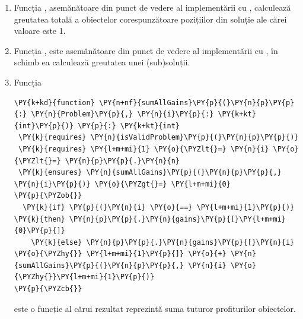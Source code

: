 \begin{sloppypar}
\begin{enumerate}
\begin{Verbatim}[commandchars=\\\{\}]
  \PY{k}{requires} \PY{l+m+mi}{0} \PY{o}{\PYZlt{}=} \PY{o}{|}\PY{n}{solution}\PY{o}{|} \PY{o}{\PYZlt{}=} \PY{o}{|}\PY{n}{p}\PY{p}{.}\PY{n}{gains}\PY{o}{|}
  \PY{k}{ensures} \PY{n}{computeGain}\PY{p}{(}\PY{n}{p}\PY{p}{,} \PY{n}{solution}\PY{p}{,} \PY{n}{i}\PY{p}{)} \PY{o}{\PYZgt{}=} \PY{l+m+mi}{0}
\PY{p}{\PYZob{}}
  \PY{k}{if} \PY{n}{i} \PY{o}{==} \PY{l+m+mi}{0} \PY{k}{then} \PY{n}{solution}\PY{p}{[}\PY{l+m+mi}{0}\PY{p}{]} \PY{o}{*} \PY{n}{p}\PY{p}{.}\PY{n}{gains}\PY{p}{[}\PY{l+m+mi}{0}\PY{p}{]} \PY{k}{else} 
  \PY{n}{solution}\PY{p}{[}\PY{n}{i}\PY{p}{]} \PY{o}{*} \PY{n}{p}\PY{p}{.}\PY{n}{gains}\PY{p}{[}\PY{n}{i}\PY{p}{]} \PY{o}{+} \PY{n}{computeGain}\PY{p}{(}\PY{n}{p}\PY{p}{,} \PY{n}{solution}\PY{p}{,} \PY{n}{i} \PY{o}{\PYZhy{}} \PY{l+m+mi}{1}\PY{p}{)}
\PY{p}{\PYZcb{}}
\end{Verbatim}
    spre deosebire de $gain$, poate primi o subsoluție al cărui profit se dorește a fi calculat prin specificarea unui index $i$ reprezentând poziția de la final spre început a subsoluției. Este o funcție recursivă a cărei finalitate este asigurată prin condiția $i == 0$.
    \item Funcția , asemănătoare din punct de vedere al implementării cu , calculează greutatea totală a obiectelor corespunzătoare pozițiilor din soluție ale cărei valoare este 1.
    \item Funcția , este asemănătoare din punct de vedere al implementării cu , în schimb ea calculează greutatea unei (sub)soluții.
    \item Funcția 
    \begin{Verbatim}[commandchars=\\\{\}]
\PY{k+kd}{function} \PY{n+nf}{sumAllGains}\PY{p}{(}\PY{n}{p}\PY{p}{:} \PY{n}{Problem}\PY{p}{,} \PY{n}{i}\PY{p}{:} \PY{k+kt}{int}\PY{p}{)} \PY{p}{:} \PY{k+kt}{int}
 \PY{k}{requires} \PY{n}{isValidProblem}\PY{p}{(}\PY{n}{p}\PY{p}{)}
 \PY{k}{requires} \PY{l+m+mi}{1} \PY{o}{\PYZlt{}=} \PY{n}{i} \PY{o}{\PYZlt{}=} \PY{n}{p}\PY{p}{.}\PY{n}{n}
 \PY{k}{ensures} \PY{n}{sumAllGains}\PY{p}{(}\PY{n}{p}\PY{p}{,} \PY{n}{i}\PY{p}{)} \PY{o}{\PYZgt{}=} \PY{l+m+mi}{0}
\PY{p}{\PYZob{}}
  \PY{k}{if} \PY{p}{(}\PY{n}{i} \PY{o}{==} \PY{l+m+mi}{1}\PY{p}{)} \PY{k}{then} \PY{n}{p}\PY{p}{.}\PY{n}{gains}\PY{p}{[}\PY{l+m+mi}{0}\PY{p}{]} 
    \PY{k}{else} \PY{n}{p}\PY{p}{.}\PY{n}{gains}\PY{p}{[}\PY{n}{i} \PY{o}{\PYZhy{}} \PY{l+m+mi}{1}\PY{p}{]} \PY{o}{+} \PY{n}{sumAllGains}\PY{p}{(}\PY{n}{p}\PY{p}{,} \PY{n}{i} \PY{o}{\PYZhy{}}\PY{l+m+mi}{1}\PY{p}{)}
\PY{p}{\PYZcb{}}
\end{Verbatim} 
    este o funcție al cărui rezultat reprezintă suma tuturor profiturilor obiectelor.
\end{enumerate}


\end{sloppypar}
